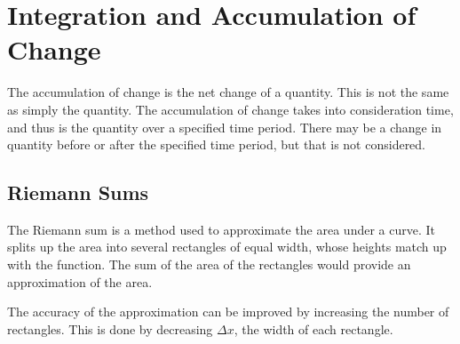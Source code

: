 \section{Integration and Accumulation of Change}
The accumulation of change is the net change of a quantity. This is not the same as simply the quantity. The accumulation of change takes into consideration time, and thus is the quantity over a specified time period. There may be a change in quantity before or after the specified time period, but that is not considered.

\subsection{Riemann Sums}
The Riemann sum is a method used to approximate the area under a curve. It splits up the area into several rectangles of equal width, whose heights match up with the function. The sum of the area of the rectangles would provide an approximation of the area.

The accuracy of the approximation can be improved by increasing the number of rectangles. This is done by decreasing $\Delta x$, the width of each rectangle.

